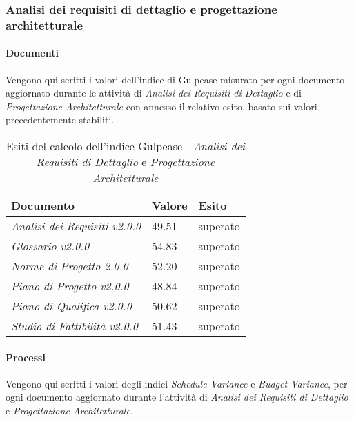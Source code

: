     \label{AdR_Dettaglio}
    \subsubsection{Analisi dei requisiti di dettaglio e progettazione architetturale}
    \paragraph{Documenti} \Spazio
    Vengono qui scritti i valori dell'indice di Gulpease misurato per ogni documento aggiornato durante le attività di \textit{Analisi dei Requisiti di Dettaglio} e di \emph{Progettazione Architetturale} con annesso il relativo esito, basato sui valori precedentemente stabiliti.
    
    \begin{table}[H]
    	\centering
    	\begin{tabular}{|C{7cm}|C{2cm}|C{2cm}|}
    		\hline
    		\textbf{Documento} & \textbf{Valore} & \textbf{Esito}  \\
    		\hline
    		\textit{Analisi dei Requisiti v2.0.0} & 49.51 & superato \\
    		\hline
    		\textit{Glossario v2.0.0} & 54.83 & superato \\
    		\hline
    		\textit{Norme di Progetto 2.0.0} & 52.20 & superato \\
    		\hline
    		\textit{Piano di Progetto v2.0.0} & 48.84 & superato \\
    		\hline
    		\textit{Piano di Qualifica v2.0.0} & 50.62 & superato \\
    		\hline
    		\textit{Studio di Fattibilità v2.0.0} & 51.43 & superato \\
    		\hline
    		
    	\end{tabular}
    	\caption{Esiti del calcolo dell'indice Gulpease - \textit{Analisi dei Requisiti di Dettaglio} e \textit{Progettazione Architetturale}}
    \end{table}
    \paragraph{Processi} \Spazio
    Vengono qui scritti i valori degli indici \textit{Schedule Variance} e \textit{Budget Variance}, per ogni documento aggiornato durante l'attività di \textit{Analisi dei Requisiti di Dettaglio} e \textit{Progettazione Architetturale}. 
    
